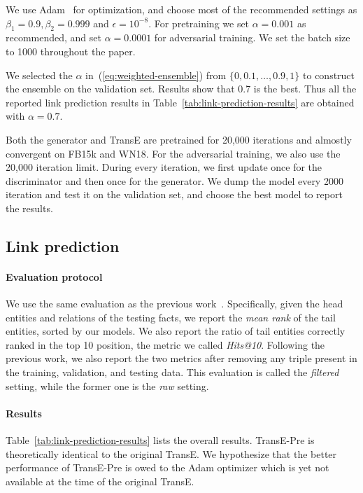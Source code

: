 \documentclass[twocolumn,a4paper,10pt,preprint,3p]{elsarticle}
\begin{document}
We use Adam~\cite{Adam} for optimization, and choose most of the recommended settings as $\beta_1=0.9,\beta_2=0.999$ and $\epsilon=10^{-8}$. For pretraining we set $\alpha=0.001$ as recommended, and set $\alpha=0.0001$ for adversarial training. We set the batch size to 1000 throughout the paper.

We selected the $\alpha$ in~(\ref{eq:weighted-ensemble}) from $ \{0, 0.1, \dots, 0.9, 1\} $ to construct the ensemble on the validation set. Results show that 0.7 is the best. Thus all the reported link prediction results in Table~\ref{tab:link-prediction-results} are obtained with $\alpha=0.7$.

Both the generator and TransE are pretrained for 20,000 iterations and almostly convergent on FB15k and WN18. For the adversarial training, we also use the 20,000 iteration limit. During every iteration, we first update once for the discriminator and then once for the generator. We dump the model every 2000 iteration and test it on the validation set, and choose the best model to report the results.

\subsection{Link prediction}

\paragraph{Evaluation protocol} We use the same evaluation as the previous work~\cite{TransE2013,TransR2015,TransG,TransD}. Specifically, given the head entities and relations of the testing facts, we report the \emph{mean rank} of the tail entities, sorted by our models. We also report the ratio of tail entities correctly ranked in the top 10 position, the metric we called \emph{Hits@10}. Following the previous work, we also report the two metrics after removing any triple present in the training, validation, and testing data. This evaluation is called the \emph{filtered} setting, while the former one is the \emph{raw} setting.

\paragraph{Results} Table~\ref{tab:link-prediction-results} lists the overall results. TransE-Pre is theoretically identical to the original TransE. We hypothesize that the better performance of TransE-Pre is owed to the Adam optimizer which is yet not available at the time of the original TransE.
\end{document}
